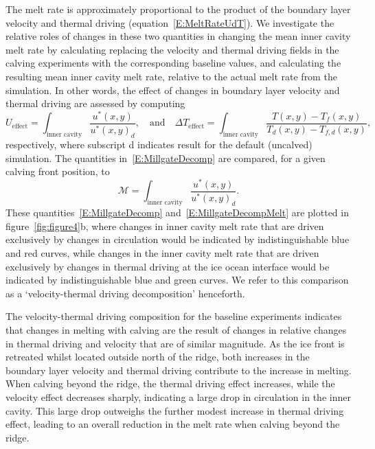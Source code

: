 \documentclass[draft]{agujournal2019}
\begin{document}
 The melt rate is approximately proportional to the product of the boundary layer velocity and thermal driving (equation~\eqref{E:MeltRateUdT}). We investigate the relative roles of changes in these two quantities in changing the mean inner cavity melt rate by calculating replacing the velocity and thermal driving fields in the calving experiments with the corresponding baseline values, and calculating the resulting mean inner cavity melt rate, relative to the actual melt rate from the simulation. In other words, the effect of changes in boundary layer velocity and thermal driving are assessed by computing
 \begin{equation}\label{E:MillgateDecomp}
U_{\text{effect}} =  \int_{\text{inner cavity}}\frac{u^*(x,y)}{u^*(x,y)_d}, \quad \text{and} \quad \Delta T_{\text{effect}} = \int_{\text{inner cavity}}\frac{T(x,y) - T_f(x,y)}{T_d(x,y) - T_{f,d}(x,y)},
 \end{equation}
  respectively, where subscript d indicates result for the default (uncalved) simulation. The quantities in~\eqref{E:MillgateDecomp} are compared, for a given calving front position, to
 \begin{equation}\label{E:MillgateDecompMelt}
   \mathcal{M} =  \int_{\text{inner cavity}}\frac{u^*(x,y)}{u^*(x,y)_d}.
 \end{equation}
These quantities~\eqref{E:MillgateDecomp} and~\eqref{E:MillgateDecompMelt} are plotted in figure~\ref{fig:figure4}b, where changes in inner cavity melt rate that are driven exclusively by changes in circulation would be indicated by indistinguishable blue and red curves, while changes in the inner cavity melt rate that are driven exclusively by changes in thermal driving at the ice ocean interface would be indicated by indistinguishable blue and green curves. We refer to this comparison as a `velocity-thermal driving decomposition' henceforth.

The velocity-thermal driving composition for the baseline experiments indicates that changes in melting with calving are the result of changes in relative changes in thermal driving and velocity that are of similar magnitude. As the ice front is retreated whilst located outside north of the ridge, both increases in the boundary layer velocity and thermal driving contribute to the increase in melting. When calving beyond the ridge, the thermal driving effect increases, while the velocity effect decreases sharply, indicating a large drop in circulation in the inner cavity. This large drop outweighs the further modest increase in thermal driving effect, leading to an overall reduction in the melt rate when calving beyond the ridge.
\end{document}

